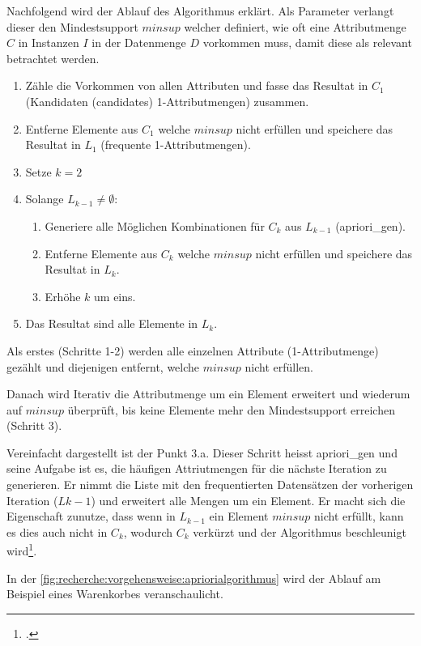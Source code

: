 Nachfolgend wird der Ablauf des Algorithmus erklärt.
Als Parameter verlangt dieser den Mindestsupport $minsup$ welcher definiert, wie oft eine Attributmenge $C$ in Instanzen $I$ in der Datenmenge $D$ vorkommen muss, damit diese als relevant betrachtet werden.
\begin{enumerate}
	\item Zähle die Vorkommen von allen Attributen und fasse das Resultat in $C_1$ (Kandidaten (candidates) 1-Attributmengen) zusammen.
	\item Entferne Elemente aus $C_1$ welche $minsup$ nicht erfüllen und speichere das Resultat in $L_1$ (frequente 1-Attributmengen).
	\item Setze $k=2$
	\item Solange $L_{k-1} \neq \emptyset$:
	\begin {enumerate}
	\item Generiere alle Möglichen Kombinationen für $C_k$ aus $L_{k-1}$ (apriori\_gen).
	\item Entferne Elemente aus $C_k$ welche $minsup$ nicht erfüllen und speichere das Resultat in $L_k$.
	\item Erhöhe $k$ um eins.
\end{enumerate}
\item Das Resultat sind alle Elemente in $L_k$.
\end{enumerate}

Als erstes (Schritte 1-2) werden alle einzelnen Attribute (1-Attributmenge) gezählt und diejenigen entfernt, welche $minsup$ nicht erfüllen.

Danach wird Iterativ die Attributmenge um ein Element erweitert und wiederum auf $minsup$ überprüft, bis keine Elemente mehr den Mindestsupport erreichen (Schritt 3).

Vereinfacht dargestellt ist der Punkt 3.a. Dieser Schritt heisst apriori\_gen und seine Aufgabe ist es, die häufigen Attriutmengen für die nächste Iteration zu generieren. Er nimmt die Liste mit den frequentierten Datensätzen der vorherigen Iteration ($L{k-1}$) und erweitert alle Mengen um ein Element. Er macht sich die Eigenschaft zunutze, dass wenn in $L_{k-1}$ ein Element $minsup$ nicht erfüllt, kann es dies auch nicht in $C_k$, wodurch $C_k$ verkürzt und der Algorithmus beschleunigt wird\footcite{data_mining_concepts_and_techniques}.

In der \cref{fig:recherche:vorgehensweise:apriorialgorithmus} wird der Ablauf am Beispiel eines Warenkorbes veranschaulicht.

